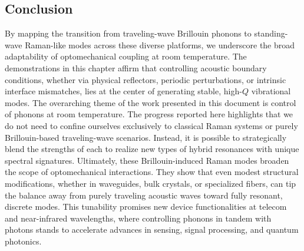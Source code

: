 \subsection{Conclusion}
\label{subsec:Raman:Conclusion}

By mapping the transition from traveling-wave Brillouin phonons to standing-wave Raman-like modes across these diverse platforms, we underscore the broad adaptability of optomechanical coupling at room temperature. The demonstrations in this chapter affirm that controlling acoustic boundary conditions, whether via physical reflectors, periodic perturbations, or intrinsic interface mismatches, lies at the center of generating stable, high-\(Q\) vibrational modes. The overarching theme of the work presented in this document is control of phonons at room temperature. The progress reported here highlights that we do not need to confine ourselves exclusively to classical Raman systems or purely Brillouin-based traveling-wave scenarios. Instead, it is possible to strategically blend the strengths of each to realize new types of hybrid resonances with unique spectral signatures. Ultimately, these Brillouin-induced Raman modes broaden the scope of optomechanical interactions. They show that even modest structural modifications, whether in waveguides, bulk crystals, or specialized fibers, can tip the balance away from purely traveling acoustic waves toward fully resonant, discrete modes. This tunability promises new device functionalities at telecom and near-infrared wavelengths, where controlling phonons in tandem with photons stands to accelerate advances in sensing, signal processing, and quantum photonics.

\clearpage
\thispagestyle{empty}
\null
\newpage

